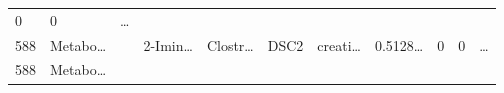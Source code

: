 \documentclass[
]{article}
\begin{document}
\begin{longtable}[]{@{}lllllllllll@{}}
\begin{minipage}[t]{0.07\columnwidth}
0\strut
\end{minipage} & \begin{minipage}[t]{0.07\columnwidth}\raggedright
0\strut
\end{minipage} & \begin{minipage}[t]{0.03\columnwidth}\raggedright
\ldots{}\strut
\end{minipage}\tabularnewline
\begin{minipage}[t]{0.03\columnwidth}\raggedright
588\strut
\end{minipage} & \begin{minipage}[t]{0.07\columnwidth}\raggedright
Metabo\ldots{}\strut
\end{minipage} & \begin{minipage}[t]{0.07\columnwidth}\raggedright
\strut
\end{minipage} & \begin{minipage}[t]{0.09\columnwidth}\raggedright
2-Imin\ldots{}\strut
\end{minipage} & \begin{minipage}[t]{0.07\columnwidth}\raggedright
Clostr\ldots{}\strut
\end{minipage} & \begin{minipage}[t]{0.07\columnwidth}\raggedright
DSC2\strut
\end{minipage} & \begin{minipage}[t]{0.09\columnwidth}\raggedright
creati\ldots{}\strut
\end{minipage} & \begin{minipage}[t]{0.07\columnwidth}\raggedright
0.5128\ldots{}\strut
\end{minipage} & \begin{minipage}[t]{0.07\columnwidth}\raggedright
0\strut
\end{minipage} & \begin{minipage}[t]{0.07\columnwidth}\raggedright
0\strut
\end{minipage} & \begin{minipage}[t]{0.03\columnwidth}\raggedright
\ldots{}\strut
\end{minipage}\tabularnewline
\begin{minipage}[t]{0.03\columnwidth}\raggedright
588\strut
\end{minipage} & \begin{minipage}[t]{0.07\columnwidth}\raggedright
Metabo\ldots{}\strut
\end{minipage} & \begin{minipage}[t]{0.07\columnwidth}\raggedright

\end{minipage}
\end{longtable}
\end{document}
